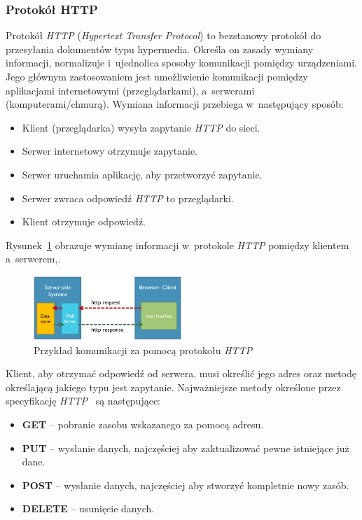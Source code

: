 \subsubsection{Protokół HTTP}
\label{sec:http}
Protokół \emph{HTTP} (\emph{Hypertext Transfer Protocol}) to bezstanowy protokół do przesyłania dokumentów typu hypermedia. Określa on zasady wymiany informacji, normalizuje i~ujednolica sposoby komunikacji pomiędzy urządzeniami. Jego głównym zastosowaniem jest umożliwienie komunikacji pomiędzy aplikacjami internetowymi (przeglądarkami), a~serwerami (komputerami/chmurą). Wymiana informacji przebiega w~następujący sposób:
\begin{itemize}
    \item Klient (przeglądarka) wysyła zapytanie \emph{HTTP} do sieci.
    \item Serwer internetowy otrzymuje zapytanie.
    \item Serwer uruchamia aplikację, aby przetworzyć zapytanie.
    \item Serwer zwraca odpowiedź \emph{HTTP} to przeglądarki.\
    \item Klient otrzymuje odpowiedź.
\end{itemize}
Rysunek~\ref{fig:httpExample} obrazuje wymianę informacji w~protokole \emph{HTTP} pomiędzy klientem a~serwerem,.
\begin{figure}
    \centering
    \includegraphics[width=0.5\textwidth,height=0.5\textheight,keepaspectratio]{./assets/httpRequestExample.png}
    \caption{Przykład komunikacji za pomocą protokołu \emph{HTTP}~\cite{HTTP}}
    \label{fig:httpExample}
\end{figure}

Klient, aby otrzymać odpowiedź od serwera, musi określić jego adres oraz metodę określającą jakiego typu jest zapytanie. Najważniejsze metody określone przez specyfikację \emph{HTTP}~\cite{HTTPSpecification} są następujące:
\begin{itemize}
    \item \textbf{GET} -- pobranie zasobu wskazanego za pomocą adresu.
    \item \textbf{PUT} -- wysłanie danych, najczęściej aby zaktualizować pewne istniejące już dane.
    \item \textbf{POST} -- wysłanie danych, najczęściej aby stworzyć kompletnie nowy zasób.
    \item \textbf{DELETE} -- usunięcie danych.
\end{itemize}

